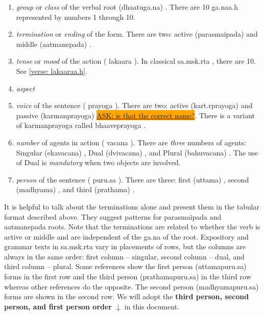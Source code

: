 \documentclass[a4paper, 12pt]{article}
\newcommand\ASK[1]{\colorbox{orange}{\underline{\tiny{ASK: #1}}}}
\newenvironment{captionedlabeledlistenv}[1]
    {\begin{myfloat}[tb]
      \begin{enumerate}
    \caption{#1}
    }
    {\end{enumerate}\end{myfloat}
    }
\newcommand \sans[1]{
    \textsanskrit{#1}
}
\begin{document}
\begin{captionedlabeledlistenv}{Conjugation Parameters}\label{list: conjugation parameters}
    \item \emph{group} or \emph{class} of the verbal root \sans{(dhaatuga.na)}. There are 10 \sans{ga.naa.h} represented by numbers 1 through 10.
    \item \emph{termination} or \emph{ending} of the form. There are two: active \sans{(parasmaipada)} and middle \sans{(aatmanepada)}.
    \item \emph{tense} or \emph{mood} of the action (\sans{lakaara}). In classical \sans{sa.msk.rta}, there are 10. See \ref{verse: lakaaraa.h}.
    \item \emph{aspect} 
    \item \emph{voice} of the sentence (\sans{prayoga}). There are two: active \sans{(kart.rprayoga)} and passive \sans{(karmanprayoga)} \ASK{is that the correct name?}. There is a variant of \sans{karmanprayoga} called \sans{bhaaveprayoga}.
    \item \emph{number} of agents in action (\sans{vacana}). There are \emph{three} numbers of agents: Singular \sans{(ekavacana)}, Dual \sans{(dvivacana)}, and Plural \sans{(bahuvacana)}. The use of Dual is \emph{mandatory} when two objects are involved.
    \item \emph{person} of the sentence (\sans{puru.sa}). There are three: first \sans{(uttama)}, second \sans{(madhyama)}, and third \sans{(prathama)}.
\end{captionedlabeledlistenv}

It is helpful to talk about the terminations alone and present them in the tabular format described above. They suggest patterns for \sans{parasmaipada} and \sans{aatmanepada} roots. Note that the terminations are related to whether the verb is active or middle and are independent of the \sans{ga.na} of the root. Expository and grammar texts in \sans{sa.msk.rta} vary in placements of rows, but the columns are always in the same order: first column -- singular, second column -- dual, and third column -- plural. Some references show the first person \sans{(uttamapuru.sa)} forms in the first row and the third person \sans{(prathamapuru.sa)} in the third row whereas other references do the opposite. The second person \sans{(madhyamapuru.sa)} forms are shown in the second row. We will adopt the \textbf{third person, second person, and first person order $\downarrow$} in this document.
\end{document}

